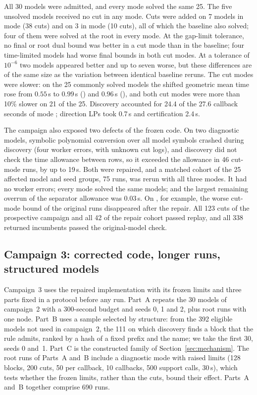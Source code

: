 All 30 models were admitted, and every mode solved the same 25. The five
unsolved models received no cut in any mode. Cuts were added on 7 models
in mode  (38 cuts) and on 3 in mode  (10 cuts), all of
which the baseline also solved; four of them were solved at the root in
every mode. At the gap-limit tolerance, no final or root dual bound was
better in a cut mode than in the baseline; four time-limited models had
worse final bounds in both cut modes. At a tolerance of $10^{-6}$ two models
appeared better and up to seven worse, but these differences are of the
same size as the variation between identical baseline reruns. The cut
modes were slower: on the 25 commonly solved models the shifted geometric
mean time rose from $0.55$\,s to $0.99$\,s () and $0.96$\,s
(), and both cut modes were more than 10\% slower on 21 of the
25. Discovery accounted for 24.4 of the 27.6 callback seconds of mode
; direction LPs took 0.7\,s and certification 2.4\,s.

The campaign also exposed two defects of the frozen code. On two
diagnostic models, symbolic polynomial conversion over all model symbols
crashed during discovery (four worker errors, with unknown cut logs), and
discovery did not check the time allowance between rows, so it exceeded
the allowance in 46 cut-mode runs, by up to 19\,s. Both were repaired, and
a matched cohort of the 25 affected model and seed groups, 75 runs, was
rerun with all three modes. It had no worker errors; every mode solved the
same models; and the largest remaining overrun of the separator allowance
was 0.03\,s. On , for example, the worse cut-mode
bound of the original runs disappeared after the repair. All 123 cuts of
the prospective campaign and all 42 of the repair cohort passed replay,
and all 338 returned incumbents passed the original-model check.

\subsection{Campaign 3: corrected code, longer runs, structured models}\label{sec:campaign3}

Campaign~3 uses the repaired implementation with its frozen limits and
three parts fixed in a protocol before any run. Part~A repeats the 30
models of campaign~2 with a 300-second budget and seeds 0, 1 and 2, plus
root runs with one node. Part~B uses a sample selected by structure: from
the 392 eligible models not used in campaign~2, the 111 on which discovery
finds a block that the  rule admits, ranked by a hash of a
fixed prefix and the name; we take the first 30, seeds 0 and~1. Part~C is
the constructed family of Section~\ref{sec:mechanism}. The root runs of
Parts~A and~B include a diagnostic mode  with raised limits
(128 blocks, 200 cuts, 50 per callback, 10 callbacks, 500 support calls,
30\,s), which tests whether the frozen limits, rather than the cuts, bound
their effect. Parts~A and~B together comprise 690 runs.

